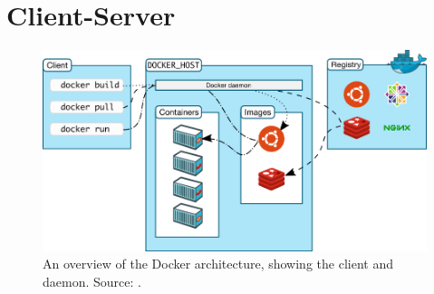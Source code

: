 \section{Client-Server}
\begin{figure}[H]
\caption{An overview of the Docker architecture, showing the client and daemon. Source: \cite{dockerarchi}.}
\centering
\includegraphics[scale=0.4]{4-softwarearch/images/architecture.png}
\end{figure}

